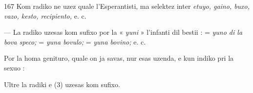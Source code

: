 \begin{VUpage}[171]{167}
Kom radiko ne uzez  quale l'Esperantisti, ma selektez\nl
inter \textit{etuyo, gaino, buxo, vazo, kesto, recipiento,} e. c.

 --- La radiko  uzesas kom sufixo por la « \textit{yuni} »\nl
l'infanti dil bestii :  = \textit{yuno di la bova speco;} \cc
{} = \textit{yuna bovulo;}  = \textit{yuna bovino;} \nl
{} e. c.

Por la homa genituro, quale on ja savas, nur \cc
{} esas uzenda, e kun indiko pri la sexuo : \nl
{}

Ultre  la radiki   e  (3) uzesas kom sufixo.
\end{VUpage}

